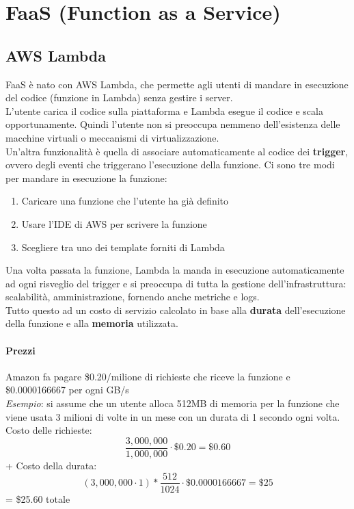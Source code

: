 \newpage
\section{FaaS (Function as a Service)}

\subsection{AWS Lambda}
FaaS è nato con AWS Lambda, che permette agli utenti di mandare in esecuzione del codice (funzione in Lambda) senza gestire i server.\\
L’utente carica il codice sulla piattaforma e Lambda esegue il codice e scala opportunamente. Quindi l’utente non si preoccupa nemmeno dell’esistenza delle macchine virtuali o meccanismi di virtualizzazione.\\
Un’altra funzionalità è quella di associare automaticamente al codice dei \textbf{trigger}, ovvero degli eventi che triggerano l’esecuzione della funzione. Ci sono tre modi per mandare in esecuzione la funzione:
\begin{enumerate}
    \item Caricare una funzione che l'utente ha già definito
    \item Usare l'IDE di AWS per scrivere la funzione
    \item Scegliere tra uno dei template forniti di Lambda
\end{enumerate}

Una volta passata la funzione, Lambda la manda in esecuzione automaticamente ad ogni risveglio del trigger e si preoccupa di tutta la gestione dell’infrastruttura: scalabilità, amministrazione, fornendo anche metriche e logs.\\
Tutto questo ad un costo di servizio calcolato in base alla \textbf{durata} dell’esecuzione della funzione e alla \textbf{memoria} utilizzata.

\paragraph{Prezzi} Amazon fa pagare \$0.20/milione di richieste che riceve la funzione e \$0.0000166667 per ogni GB/s\\
\textit{Esempio}: si assume che un utente alloca 512MB di memoria per la funzione che viene usata 3 milioni di volte in un mese con un durata di 1 secondo ogni volta.\\
Costo delle richieste: $$\frac{3,000,000}{1,000,000} \cdot \$0.20 = \$0.60$$ + Costo della durata: $$ (3,000,000 \cdot 1) * \frac{512}{1024} \cdot \$0.0000166667 = \$25 $$
= \$25.60 totale
 
